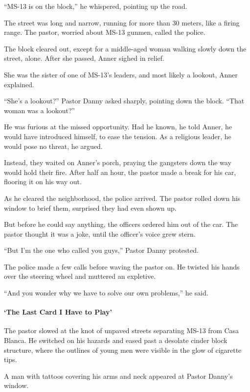 ``MS-13 is on the block,'' he whispered, pointing up the road.

The street was long and narrow, running for more than 30 meters, like a
firing range. The pastor, worried about MS-13 gunmen, called the police.

The block cleared out, except for a middle-aged woman walking slowly
down the street, alone. After she passed, Anner sighed in relief.

She was the sister of one of MS-13's leaders, and most likely a lookout,
Anner explained.

``She's a lookout?'' Pastor Danny asked sharply, pointing down the
block. ``That woman was a lookout?''

He was furious at the missed opportunity. Had he known, he told Anner,
he would have introduced himself, to ease the tension. As a religious
leader, he would pose no threat, he argued.

Instead, they waited on Anner's porch, praying the gangsters down the
way would hold their fire. After half an hour, the pastor made a break
for his car, flooring it on his way out.

As he cleared the neighborhood, the police arrived. The pastor rolled
down his window to brief them, surprised they had even shown up.

But before he could say anything, the officers ordered him out of the
car. The pastor thought it was a joke, until the officer's voice grew
stern.

``But I'm the one who called you guys,'' Pastor Danny protested.

The police made a few calls before waving the pastor on. He twisted his
hands over the steering wheel and muttered an expletive.

``And you wonder why we have to solve our own problems,'' he said.

\hypertarget{the-last-card-i-have-to-play}{%
\paragraph{`The Last Card I Have to
Play'}\label{the-last-card-i-have-to-play}}

The pastor slowed at the knot of unpaved streets separating MS-13 from
Casa Blanca. He switched on his hazards and eased past a desolate cinder
block structure, where the outlines of young men were visible in the
glow of cigarette tips.

A man with tattoos covering his arms and neck appeared at Pastor Danny's
window.

